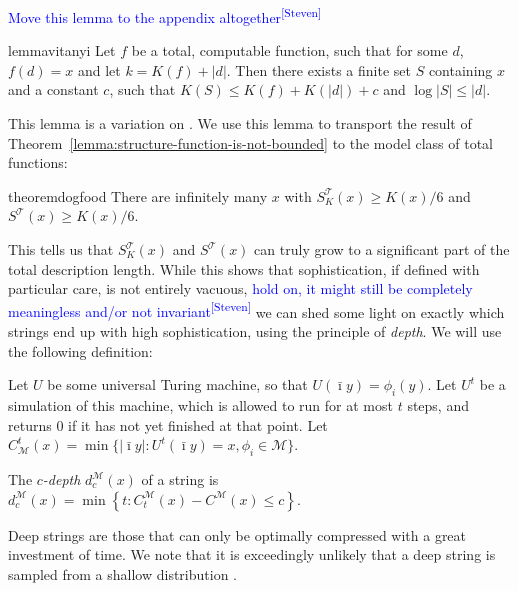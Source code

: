 \documentclass{style/llncs}
\newcommand{\M}{\mathscr M}
\newcommand{\T}{\mathscr T}
\newcommand{\sdr}[1]{\textcolor{blue}{\small #1\textsuperscript{[Steven]} }}
\begin{document}
\sdr{Move this lemma to the appendix altogether}
\begin{restatable}{lemma}{vitanyi}
Let $f$ be a total, computable function, such that for some $d$, $f(d) = x$ and let $k = K(f) + |d|$. Then there exists a finite set $S$ containing $x$ and a constant $c$, such that $K(S) \leq K(f) + K(|d|) + c$ and $\log |S| \leq |d|$.\label{lemma:total-to-sets}
\end{restatable}
\noindent This lemma is a variation on \cite[Lemma~7.2]{vitanyi2004meaningful}. We use this lemma to transport the result of Theorem~\ref{lemma:structure-function-is-not-bounded} to the model class of total functions:

\begin{restatable}{theorem}{dogfood}
There are infinitely many $x$ with $S^\T_K(x) \geq K(x)/6$ and $S^\T(x) \geq K(x)/6$. 
\end{restatable} 
\noindent This tells us that $S^\T_K(x)$ and $S^\T(x)$ can truly grow to a significant part of the total description length. While this shows that sophistication, if defined with particular care, is not entirely vacuous, \sdr{hold on, it might still be completely meaningless and/or not invariant} we can shed some light on exactly which strings end up with high sophistication, using the principle of \emph{depth}. We will use the following definition:

\begin{definition}\belowdisplayskip=-12pt
Let $U$ be some universal Turing machine, so that $U(\bar\imath y) = \phi_i(y)$. Let $U^t$ be a simulation of this machine, which is allowed to run for at most $t$ steps, and returns $0$ if it has not yet finished at that point. Let $C^t_\M(x) = \min\{|\bar\imath y| : U^t(\bar\imath y) = x, \phi_i \in \M\}$.

The \emph{$c$-depth} $d^\M_c(x)$ of a string is $d^\M_c(x) = \min \left\{t : C^\M_t(x) - C^\M(x) \leq c \right\}$.
\end{definition}

Deep strings are those that can only be optimally compressed with a great investment of time. We note that it is exceedingly unlikely that a deep string is sampled from a shallow distribution \cite{bloem2014safe,bennett1988logical}.
 
\end{document}
